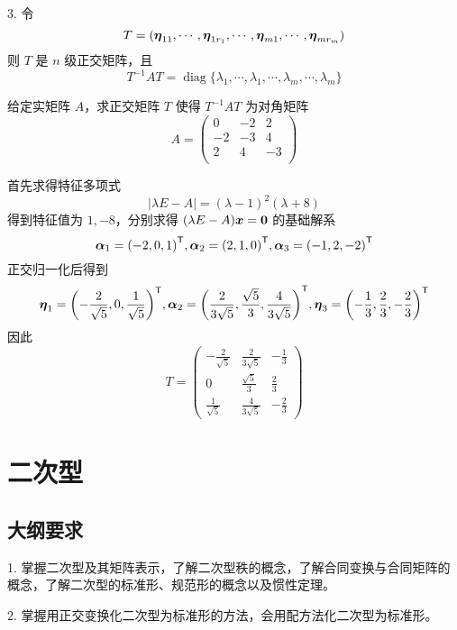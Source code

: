 3. 令
\[ T=(\boldsymbol{\eta}_{11},\cdots,\boldsymbol{\eta}_{1r_1},\cdots,\boldsymbol{\eta}_{m1},\cdots,\boldsymbol{\eta}_{mr_m}) \]
则 $T$ 是 $n$ 级正交矩阵，且
\[ T^{-1}AT = \operatorname{diag}\{\lambda_{1},\cdots,\lambda_{1},\cdots,\lambda_{m},\cdots,\lambda_{m}\} \]

\begin{example}
	给定实矩阵 $A$，求正交矩阵 $T$ 使得 $T^{-1}AT$ 为对角矩阵
	\[ A=\left(
		\begin{matrix}
				0  & -2 & 2  \\
				-2 & -3 & 4  \\
				2  & 4  & -3 \\
			\end{matrix}
		\right) \]
\end{example}

\begin{solution}
	首先求得特征多项式
	\[ |\lambda E - A| = (\lambda-1)^2(\lambda+8) \]
	得到特征值为 $1, -8$，分别求得 $(\lambda E - A) \boldsymbol{x} = \boldsymbol{0}$ 的基础解系
	\[ \boldsymbol{\alpha}_1 = {(-2, 0, 1)}^\mathsf{T}, \boldsymbol{\alpha}_2 = {(2, 1, 0)}^\mathsf{T}, \boldsymbol{\alpha}_3 = {(-1, 2, -2)}^\mathsf{T} \]
	正交归一化后得到
	\[ \boldsymbol{\eta}_1 = {\left(-\frac{2}{\sqrt{5}}, 0, \frac{1}{\sqrt{5}}\right)}^\mathsf{T}, \boldsymbol{\alpha}_2 = {\left(\frac{2}{3\sqrt{5}}, \frac{\sqrt{5}}{3}, \frac{4}{3 \sqrt{5}}\right)}^\mathsf{T}, \boldsymbol{\eta}_3 = {\left(-\frac{1}{3}, \frac{2}{3}, -\frac{2}{3}\right)}^\mathsf{T} \]
	因此
	\[ T = \left(\begin{matrix}
				-\frac{2}{\sqrt{5}} & \frac{2}{3\sqrt{5}}  & -\frac{1}{3} \\
				0                   & \frac{\sqrt{5}}{3}   & \frac{2}{3}  \\
				\frac{1}{\sqrt{5}}  & \frac{4}{3 \sqrt{5}} & -\frac{2}{3}
			\end{matrix}\right) \]
\end{solution}

\section{二次型}

\subsection{大纲要求}

1. 掌握二次型及其矩阵表示，了解二次型秩的概念，了解合同变换与合同矩阵的概念，了解二次型的标准形、规范形的概念以及惯性定理。

2. 掌握用正交变换化二次型为标准形的方法，会用配方法化二次型为标准形。

